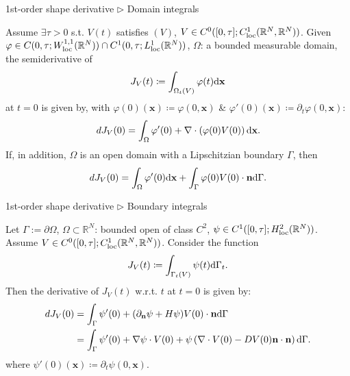 \documentclass[10pt
hyperref={
    pdfauthor={Hong Quan Ba Nguyen},
    pdftitle={Optimal Shape Design of Air Ducts in Combustion Engines: Design a General Framework},
    pdfsubject={Talk},
    pdfcreator={LaTeX},
}
]{beamer}
\begin{document}
\begin{frame}{1st-order shape derivative $\triangleright$ Domain integrals}
    \begin{theorem}
        \label{theorem domain integrals}
        Assume $\exists\tau > 0$ s.t. $V(t)$ satisfies $(V)$, $V\in C^0([0,\tau];C_{\rm loc}^1(\mathbb{R}^N,\mathbb{R}^N))$. Given $\varphi\in C(0,\tau;W_{\rm loc}^{1,1}(\mathbb{R}^N))\cap C^1(0,\tau;L_{\rm loc}^1(\mathbb{R}^N))$, $\Omega$: a bounded measurable domain, the semiderivative of
        \begin{align*}
            J_V(t)\coloneqq\int_{\Omega_t(V)} \varphi(t){\rm d}\textbf{x}
        \end{align*}
        at $t = 0$ is given by, with $\varphi(0)(\textbf{x})\coloneqq\varphi(0,\textbf{x})$ {\small\&} $\varphi'(0)(\textbf{x})\coloneqq\partial_t\varphi(0,\textbf{x})$:
        \begin{align*}
            dJ_V(0) = \int_\Omega \varphi'(0) + \nabla\cdot\left(\varphi(0)V(0)\right){\rm d}\textbf{x}.
        \end{align*}
        If, in addition, $\Omega$ is an open domain with a Lipschitzian boundary $\Gamma$, then
        \begin{align*}
            dJ_V(0) = \int_\Omega \varphi'(0){\rm d}\textbf{x} + \int_\Gamma \varphi(0)V(0)\cdot\textbf{n}{\rm d}\Gamma.
        \end{align*}
    \end{theorem}
\end{frame}

\begin{frame}{1st-order shape derivative $\triangleright$ Boundary integrals}
    \begin{theorem}
        \label{theorem boundary integrals}
        Let $\Gamma := \partial\Omega$, $\Omega\subset\mathbb{R}^N$: bounded open of class $C^2$, $\psi\in C^1([0,\tau];H_{\rm loc}^2(\mathbb{R}^N))$. Assume $V\in C^0([0,\tau];C_{\rm loc}^1(\mathbb{R}^N,\mathbb{R}^N))$. Consider the function
        \begin{align*}
            J_V(t)\coloneqq\int_{\Gamma_t(V)} \psi(t){\rm d}\Gamma_t.
        \end{align*}
        Then the derivative of $J_V(t)$ w.r.t. $t$ at $t = 0$ is given by:
        \begin{align*}
            dJ_V(0) &= \int_\Gamma \psi'(0) + (\partial_{\textbf{n}}\psi + H\psi)V(0)\cdot\textbf{n}{\rm d}\Gamma\\
            &= \int_\Gamma \psi'(0) + \nabla\psi\cdot V(0) + \psi\left(\nabla\cdot V(0) - DV(0)\textbf{n}\cdot\textbf{n}\right){\rm d}\Gamma.
        \end{align*}
        where $\psi'(0)(\textbf{x})\coloneqq\partial_t\psi(0,\textbf{x})$.
    \end{theorem}
\end{frame}
\end{document}
